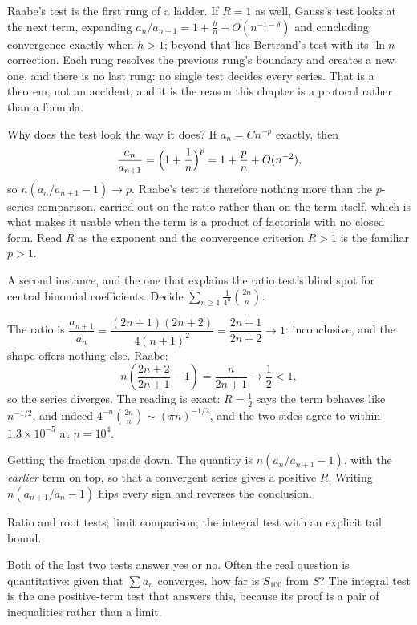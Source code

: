 Raabe's test is the first rung of a ladder. If $R=1$ as well, Gauss's test looks at the next term, expanding $a_n/a_{n+1}=1+\tfrac{h}{n}+O(n^{-1-\delta})$ and concluding convergence exactly when $h>1$; beyond that lies Bertrand's test with its $\ln n$ correction. Each rung resolves the previous rung's boundary and creates a new one, and there is no last rung: no single test decides every series. That is a theorem, not an accident, and it is the reason this chapter is a protocol rather than a formula.

Why does the test look the way it does? If $a_n=Cn^{-p}$ exactly, then
\[\frac{a_n}{a_{n+1}}=\Bigl(1+\frac1n\Bigr)^{p}=1+\frac{p}{n}+O(n^{-2}),\]
so $n(a_n/a_{n+1}-1)\to p$. Raabe's test is therefore nothing more than the $p$-series comparison, carried out on the ratio rather than on the term itself, which is what makes it usable when the term is a product of factorials with no closed form. Read $R$ as the exponent and the convergence criterion $R>1$ is the familiar $p>1$.

\begin{worked}
A second instance, and the one that explains the ratio test's blind spot for central binomial coefficients. Decide $\displaystyle\sum_{n\geq1}\frac{1}{4^{n}}\binom{2n}{n}$.

The ratio is $\dfrac{a_{n+1}}{a_n}=\dfrac{(2n+1)(2n+2)}{4(n+1)^2}=\dfrac{2n+1}{2n+2}\to1$: inconclusive, and the shape offers nothing else. Raabe:
\[n\left(\frac{2n+2}{2n+1}-1\right)=\frac{n}{2n+1}\to\frac12<1,\]
so the series diverges. The reading is exact: $R=\tfrac12$ says the term behaves like $n^{-1/2}$, and indeed $4^{-n}\binom{2n}{n}\sim(\pi n)^{-1/2}$, and the two sides agree to within $1.3\times10^{-5}$ at $n=10^4$.
\end{worked}

\begin{trap}
Getting the fraction upside down. The quantity is $n(a_n/a_{n+1}-1)$, with the \emph{earlier} term on top, so that a convergent series gives a positive $R$. Writing $n(a_{n+1}/a_n-1)$ flips every sign and reverses the conclusion.
\end{trap}

\begin{seealsob}Ratio and root tests; limit comparison; the integral test with an explicit tail bound.\end{seealsob}

Both of the last two tests answer yes or no. Often the real question is quantitative: given that $\sum a_n$ converges, how far is $S_{100}$ from $S$? The integral test is the one positive-term test that answers this, because its proof is a pair of inequalities rather than a limit.

